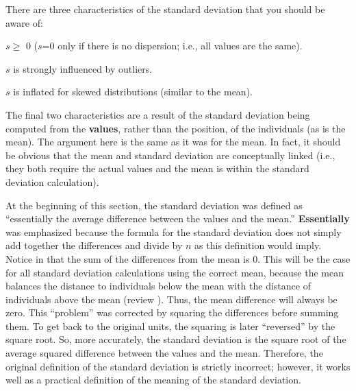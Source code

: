 \documentclass[10pt,openany]{book}\usepackage[]{graphicx}\usepackage[]{color}
\begin{document}

\vspace{-12pt}

There are three characteristics of the standard deviation that you should be aware of:
\vspace{-12pt}
\begin{Enumerate}
  \item $s \geq$ 0 ($s$=0 only if there is no dispersion; i.e., all values are the same).
  \item $s$ is strongly influenced by outliers.
  \item $s$ is inflated for skewed distributions (similar to the mean).
\end{Enumerate}
\vspace{-12pt}
The final two characteristics are a result of the standard deviation being computed from the \textbf{values}, rather than the position, of the individuals (as is the mean).  The argument here is the same as it was for the mean.  In fact, it should be obvious that the mean and standard deviation are conceptually linked (i.e., they both require the actual values and the mean is within the standard deviation calculation).


At the beginning of this section, the standard deviation was defined as ``essentially the average difference between the values and the mean.'' \textbf{Essentially} was emphasized because the formula for the standard deviation does not simply add together the differences and divide by $n$ as this definition would imply.  Notice in  that the sum of the differences from the mean is 0.  This will be the case for all standard deviation calculations using the correct mean, because the mean balances the distance to individuals below the mean with the distance of individuals above the mean (review ).  Thus, the mean difference will always be zero.  This ``problem'' was corrected by squaring the differences before summing them.  To get back to the original units, the squaring is later ``reversed'' by the square root.  So, more accurately, the standard deviation is the square root of the average squared difference between the values and the mean.  Therefore, the original definition of the standard deviation is strictly incorrect; however, it works well as a practical definition of the meaning of the standard deviation.
\end{document}
